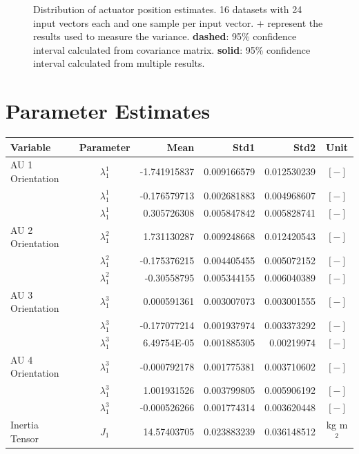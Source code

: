 \begin{figure}[hbtp]
\caption{Distribution of actuator position estimates. 16 datasets with 24 input vectors each and one sample per input vector.
$\mathbf{+}$ represent the results used to measure the variance.
\textbf{dashed}: 95\% confidence interval calculated from covariance matrix.
\textbf{solid}: 95\% confidence interval calculated from multiple results. }
\label{fig:result_95pc_confidence_all}
\end{figure}


\section{Parameter Estimates}
\label{sec:app_parameter_est}

\begin{table}[H]
\begin{tabular}{lcrrrc}
Variable & Parameter & Mean & Std1 & Std2 & Unit \\
\hline \hline
AU 1 Orientation & $\lambda_1^1$ & -1.741915837 & 0.009166579 & 0.012530239 & $[-]$ \\
                 & $\lambda_1^1$ & -0.176579713 & 0.002681883 & 0.004968607 & $[-]$ \\
                 & $\lambda_1^1$ & 0.305726308 & 0.005847842 & 0.005828741 & $[-]$ \\
AU 2 Orientation & $\lambda_1^2$ & 1.731130287 & 0.009248668 & 0.012420543 & $[-]$ \\
                 & $\lambda_1^2$ & -0.175376215 & 0.004405455 & 0.005072152 & $[-]$ \\
                 & $\lambda_1^2$ & -0.30558795 & 0.005344155 & 0.006040389 & $[-]$ \\
AU 3 Orientation & $\lambda_1^3$ & 0.000591361 & 0.003007073 & 0.003001555 & $[-]$ \\
                 & $\lambda_1^3$ & -0.177077214 & 0.001937974 & 0.003373292 & $[-]$ \\
                 & $\lambda_1^3$ & 6.49754E-05 & 0.001885305 & 0.00219974 & $[-]$ \\
AU 4 Orientation & $\lambda_1^3$ & -0.000792178 & 0.001775381 & 0.003710602 & $[-]$ \\
                 & $\lambda_1^3$ & 1.001931526 & 0.003799805 & 0.005906192 & $[-]$ \\
                 & $\lambda_1^3$ & -0.000526266 & 0.001774314 & 0.003620448 & $[-]$ \\
\hline
Inertia Tensor & $J_1$ & 14.57403705 & 0.023883239 & 0.036148512 & kg m$^2$ \\

\end{tabular}
\end{table}
